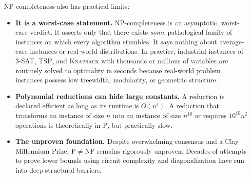NP-completeness also has practical limits:
\begin{itemize}
  \item \textbf{It is a worst-case statement.} NP-completeness is an
        asymptotic, worst-case verdict. It asserts only that there exists
        \emph{some} pathological family of instances on which every algorithm
        stumbles. It says nothing about average-case instances or real-world
        distributions. In practice, industrial instances of \textsc{3-SAT},
        \textsc{TSP}, and \textsc{Knapsack} with thousands or millions of
        variables are routinely solved to optimality in seconds because
        real-world problem instances possess low treewidth, modularity, or
        geometric structure.
  \item \textbf{Polynomial reductions can hide large constants.} A
        reduction is declared efficient as long as its runtime is $O(n^c)$.
        A reduction that transforms an instance of size $n$ into an instance of
        size $n^{10}$ or requires $10^{10} n^2$ operations is theoretically in
        $\mathrm{P}$, but practically slow.
  \item \textbf{The unproven foundation.} Despite overwhelming consensus and a
        Clay Millennium Prize, $\mathrm{P} \ne \mathrm{NP}$ remains rigorously
        unproven. Decades of attempts to prove lower bounds using circuit complexity
        and diagonalization have run into deep structural barriers.
\end{itemize}

